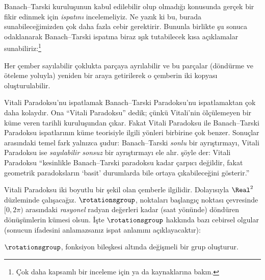 


Banach--Tarski kuruluşunun kabul edilebilir olup olmadığı konusunda gerçek
bir fikir edinmek için \emph{ispatını} incelemeliyiz. Ne yazık ki bu,
burada sunabileceğimizden çok daha fazla cebir gerektirir. Bununla birlikte
şu sonuca odaklanarak Banach--Tarski ispatına biraz ışık tutabilecek kısa
açıklamalar sunabiliriz:\footnote{Çok daha kapsamlı bir inceleme için
\cite{Weston2003} ya da \cite{Wagon2016} kaynaklarına bakın.}

\begin{thm}
Her çember sayılabilir çoklukta parçaya ayrılabilir ve bu parçalar
(döndürme ve öteleme yoluyla) yeniden bir araya getirilerek o çemberin iki
kopyası oluşturulabilir.
\end{thm}

Vitali Paradoksu'nu ispatlamak Banach--Tarski Paradoksu'nu ispatlamaktan
çok daha kolaydır. Ona ``Vitali Paradoksu'' dedik; çünkü Vitali'nin
ölçülemeyen bir küme veren \citeyear{Vitali1905} tarihli kuruluşundan
çıkar. Fakat Vitali Paradoksu ile Banach--Tarski Paradoksu ispatlarının
küme teorisiyle ilgili yönleri birbirine çok benzer. Sonuçlar arasındaki
temel fark yalnızca şudur: Banach--Tarski \emph{sonlu} bir ayrıştırmayı,
Vitali Paradoksu ise \emph{sayılabilir sonsuz} bir ayrıştırmayı ele alır.
\citet{Weston2003} şöyle der: Vitali Paradoksu ``kesinlikle Banach--Tarski
paradoksu kadar çarpıcı değildir, fakat geometrik paradoksların `basit'
durumlarda bile ortaya çıkabileceğini gösterir.''

Vitali Paradoksu iki boyutlu bir şekil olan çemberle ilgilidir. Dolayısıyla
$\Real^2$ düzleminde çalışacağız. $\rotationsgroup$, noktaları başlangıç
noktası çevresinde $[0,2\pi)$ arasındaki \emph{rasyonel} radyan değerleri
kadar (saat yönünde) döndüren dönüşümlerin kümesi olsun. İşte
$\rotationsgroup$ hakkında bazı cebirsel olgular (sonucun ifadesini
anlamazsanız ispat anlamını açıklayacaktır):

\begin{lem}
$\rotationsgroup$, fonksiyon bileşkesi altında değişmeli bir {grup}
oluşturur.
\end{lem}

